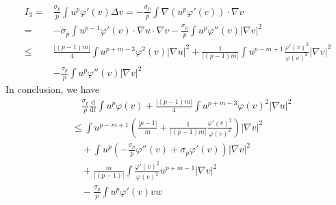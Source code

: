 \documentclass[12pt,]{article}
\begin{document}
\begin{equation}
  \begin{aligned}
    I_3=&\frac{\sigma_{p}}{p}\int u^p\varphi'(v)\Delta v = -\frac{\sigma_{p}}{p}\int \nabla(u^p\varphi'(c))\cdot\nabla v\\
    =&-\sigma_{p}\int u^{p-1}\varphi'(v)\cdot \nabla u\cdot\nabla v -\frac{\sigma_{p}}{p} \int u^p\varphi''(v)|\nabla v|^2\\
    \leqslant & \frac{|(p-1)m|}{4}\int u^{p+m-3}\varphi^2(v)|\nabla u |^{2}+\frac{1}{|(p-1)m|}\int u^{p-m+1}\frac{\varphi'(v)^2}{\varphi(v)^2}|\nabla v|^2\\
    &-\frac{\sigma_{p}}{p} \int u^p\varphi''(v)|\nabla v|^2
  \end{aligned}
\end{equation}
In conclusion, we have
\begin{equation}\label{bigpk}
  \begin{aligned}
    &\quad\frac{\sigma_{p}}{p}\frac{\mathrm{d}}{\mathrm{d} t} \int u^{p} \varphi(v) +  \frac{|(p-1)m|}{4}\int u^{p+m-3}\varphi(v)^2|\nabla u| ^2 \\
    &\leqslant \int u^{p-m+1}\left(\frac{|p-1|}{m}+\frac{1}{|(p-1)m|}\frac{\varphi'(v)^2}{\varphi(v)^2}\right)|\nabla v|^2\\
    &\quad + \int u^p\left(-\frac{\sigma_{p}}{p}\varphi''(v)+\sigma_{p}\varphi'(v)\right)|\nabla v|^2\\
    &\quad +\frac{m}{|(p-1)|}\int \frac{\varphi'(v)^2}{\varphi(v)^2}u^{p+m-1}|\nabla v|^2\\
    &\quad - \frac{\sigma_{p}}{p}\int u^p\varphi'(v)vw
  \end{aligned}
\end{equation}
\end{document}
